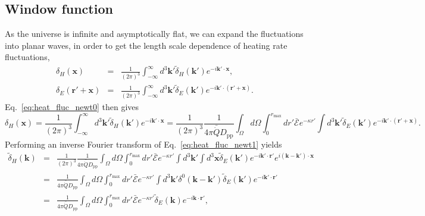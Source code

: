 \documentclass[numberedappendix]{emulateapj}
\begin{document}
% 

\subsection{Window function}
As the universe is infinite and asymptotically flat, we can expand the fluctuations into planar waves, in order to get the length scale dependence of heating rate fluctuations,
\begin{eqnarray}
  \label{eq:FT_delta}
  \delta_H(\mathbf{x})&=&\frac{1}{(2\pi)^3}\int_{-\infty}^{\infty} d^3\mathbf{k'} \tilde{\delta}_H(\mathbf{k'}) e^{-i\mathbf{k'}\cdot\mathbf{x}},\\ \nonumber
  \delta_E(\mathbf{r}'+\mathbf{x})&=&\frac{1}{(2\pi)^3}\int_{-\infty}^{\infty} d^3\mathbf{k'} \tilde{\delta}_E(\mathbf{k'}) e^{-i\mathbf{k'}\cdot(\mathbf{r'}+\mathbf{x})}.
\end{eqnarray}
Eq.~\eqref{eq:heat_fluc_newt0} then gives
\begin{equation}
  \label{eq:heat_fluc_newt1}
  \delta_H(\mathbf{x})
  =\frac{1}{(2\pi)^3}\int_{-\infty}^{\infty} d^3\mathbf{k'} \tilde{\delta}_H(\mathbf{k'}) e^{-i\mathbf{k'}\cdot\mathbf{x}}
  =\frac{1}{ (2\pi)^3}\frac{1}{4\pi\bar{\dot{Q}}D_{\mathrm{pp}}} \int_{\Omega}d\Omega\int_0^{r_{\mathrm{max}}}  dr' \bar{\mathcal{E}} e^{-\kappa r'} \int d^3\mathbf{k'} \tilde{\delta}_E(\mathbf{k'}) e^{-i\mathbf{k'}\cdot(\mathbf{r'}+\mathbf{x})}.
\end{equation}
Performing an inverse Fourier transform of Eq.~\eqref{eq:heat_fluc_newt1} yields
\begin{eqnarray}
  \label{eq:heat_fluc_newt2}
  \tilde{\delta}_H(\mathbf{k})&=& \frac{1}{(2\pi)^3} \frac{1}{4\pi\bar{\dot{Q}}D_{\mathrm{pp}}}\int_{\Omega}d\Omega\int_0^{r_{\mathrm{max}}} dr' \bar{ \mathcal{E}} e^{-\kappa r'} \int d^3\mathbf{k'}\int d^3\mathbf{x} \tilde{\delta}_E(\mathbf{k'})e^{-i\mathbf{k'}\cdot{\mathbf{r}'}} e^{i(\mathbf{k}-\mathbf{k'})\cdot\mathbf{x}} \\ \nonumber
  &=&\frac{1}{4\pi\bar{\dot{Q}}D_{\mathrm{pp}}} \int_{\Omega}d\Omega\int_0^{r_{\mathrm{max}}}   dr' \bar{\mathcal{E}}  e^{-\kappa r'} \int d^3\mathbf{k'} \delta^{0}(\mathbf{k}-\mathbf{k}')\tilde{\delta}_E(\mathbf{k'}) e^{-i\mathbf{k'}\cdot{\mathbf{r}'}}  \\ \nonumber
  &=&\frac{1}{4\pi\bar{\dot{Q}}D_{\mathrm{pp}}} \int_{\Omega}d\Omega\int_0^{r_{\mathrm{max}}}  dr' \bar{ \mathcal{E}} e^{-\kappa r'}  \tilde{\delta}_E(\mathbf{k}) e^{-i\mathbf{k}\cdot{\mathbf{r}'}}  ,
\end{eqnarray}
\end{document}
